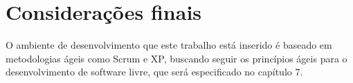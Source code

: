 \section{Considerações finais}

O ambiente de desenvolvimento que este trabalho está inserido é baseado em metodologias ágeis como Scrum e XP, buscando seguir os princípios ágeis para o desenvolvimento de software livre, que será especificado no capítulo 7.




